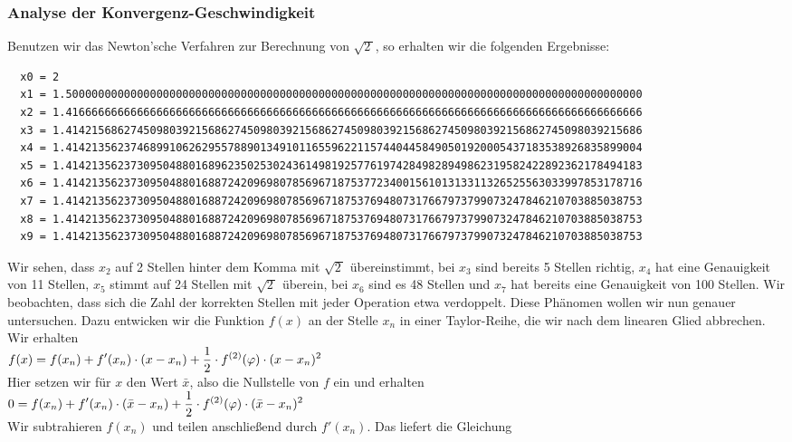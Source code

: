 \subsubsection{Analyse der Konvergenz-Geschwindigkeit}
Benutzen wir das Newton'sche Verfahren zur Berechnung  von $\sqrt{2\,}$, so erhalten wir 
die folgenden Ergebnisse:
{\footnotesize
\begin{verbatim}
  x0 = 2
  x1 = 1.50000000000000000000000000000000000000000000000000000000000000000000000000000000000000000
  x2 = 1.41666666666666666666666666666666666666666666666666666666666666666666666666666666666666666
  x3 = 1.41421568627450980392156862745098039215686274509803921568627450980392156862745098039215686
  x4 = 1.41421356237468991062629557889013491011655962211574404458490501920005437183538926835899004
  x5 = 1.41421356237309504880168962350253024361498192577619742849828949862319582422892362178494183
  x6 = 1.41421356237309504880168872420969807856967187537723400156101313311326525563033997853178716
  x7 = 1.41421356237309504880168872420969807856967187537694807317667973799073247846210703885038753
  x8 = 1.41421356237309504880168872420969807856967187537694807317667973799073247846210703885038753
  x9 = 1.41421356237309504880168872420969807856967187537694807317667973799073247846210703885038753
\end{verbatim}}
Wir sehen, dass $x_2$ auf 2 Stellen hinter dem Komma mit $\sqrt{2\,}$ \"ubereinstimmt,
bei $x_3$ sind bereits 5 Stellen richtig, $x_4$ hat eine Genauigkeit von 11 Stellen,
$x_5$ stimmt auf 24 Stellen mit $\sqrt{2\,}$ \"uberein, bei $x_6$ sind es 48 Stellen und $x_7$ hat
bereits eine Genauigkeit von 100 Stellen.  Wir beobachten, dass sich die Zahl der korrekten Stellen mit
jeder Operation etwa verdoppelt.  Diese Ph\"anomen wollen wir nun genauer untersuchen.
Dazu entwicken wir die Funktion $f(x)$ an der Stelle $x_n$  in einer Taylor-Reihe, die wir nach dem
linearen Glied abbrechen.  Wir erhalten
\\[0.2cm]
\hspace*{1.3cm}
$\displaystyle f(x) = f(x_n) + f'(x_n) \cdot (x- x_n) + \frac{1}{2} \cdot f^{(2)}(\varphi) \cdot (x - x_n)^2$
\\[0.2cm]
Hier setzen wir f\"ur $x$ den Wert $\bar{x}$, also die Nullstelle von $f$ ein und erhalten
\\[0.2cm]
\hspace*{1.3cm}
$\displaystyle 0 =  f(x_n) + f'(x_n) \cdot (\bar{x} - x_n) + \frac{1}{2} \cdot f^{(2)}(\varphi) \cdot (\bar{x} - x_n)^2$
\\[0.2cm]
Wir subtrahieren $f(x_n)$ und teilen anschlie{\ss}end durch $f'(x_n)$.  Das liefert die Gleichung
